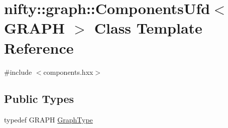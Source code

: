 \hypertarget{classnifty_1_1graph_1_1ComponentsUfd}{}\section{nifty\+:\+:graph\+:\+:Components\+Ufd$<$ G\+R\+A\+PH $>$ Class Template Reference}
\label{classnifty_1_1graph_1_1ComponentsUfd}


{\ttfamily \#include $<$components.\+hxx$>$}

\subsection*{Public Types}
\begin{DoxyCompactItemize}
\item 
typedef G\+R\+A\+PH \hyperlink{classnifty_1_1graph_1_1ComponentsUfd_a022ccf51b6dd4a943d3d614b97faa783}{Graph\+Type}
\end{DoxyCompactItemize}
